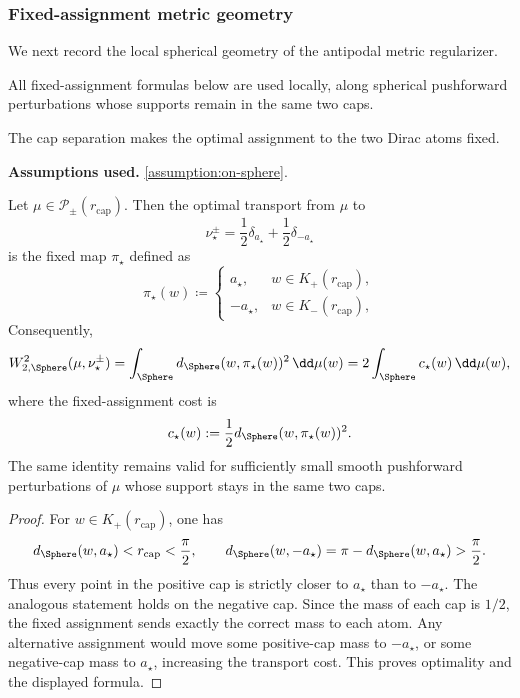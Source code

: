 \subsubsection{Fixed-assignment metric geometry}

We next record the local spherical geometry of the antipodal metric
regularizer.

All fixed-assignment formulas below are used locally, along spherical pushforward perturbations whose supports remain in the same two caps.

The cap separation makes the optimal assignment to the two Dirac atoms fixed.
\begin{lemma}
\label{lemma-fixed-assignment}
\textbf{Assumptions used.} \cref{assumption:on-sphere}.

Let \(\mu\in\mathcal P_\pm(r_{\mathrm{cap}})\).  Then the optimal transport from \(\mu\) to
\[
    \nu_\star^\pm=\frac12\delta_{a_\star}+\frac12\delta_{-a_\star}
\]
is the fixed map \(\pi_\star\)                                                               
defined as
\begin{equation}
\label{eq:mf-assigned-pole}
    \pi_\star(w)
    \coloneq
    \begin{cases}
        a_\star, & w\in K_+(r_{\mathrm{cap}}),\\
        -a_\star, & w\in K_-(r_{\mathrm{cap}}),
    \end{cases}
\end{equation}
Consequently,
\begin{equation}
\label{eq:fixed-assignment-W2-square-formula}
    W_{2,\Sphere}^2(\mu,\nu_\star^\pm)
    =
    \int_{\Sphere} d_\Sphere(w,\pi_\star(w))^2\,\dd\mu(w)
    =
    2\int_{\Sphere}c_\star(w)\,\dd\mu(w),
\end{equation}
where the fixed-assignment cost is
\begin{equation}
\label{eq:mf-fixed-assignment-cost}
c_\star(w):=\frac12 d_\Sphere(w,\pi_\star(w))^2.
\end{equation}
The same identity remains valid for sufficiently small smooth pushforward perturbations of \(\mu\) whose support stays in the same two caps.
\end{lemma}

\begin{proof}
For \(w\in K_+(r_{\mathrm{cap}})\), one has
\[
    d_\Sphere(w,a_\star)<r_{\mathrm{cap}}<\frac\pi2,
    \qquad
    d_\Sphere(w,-a_\star)=\pi-d_\Sphere(w,a_\star)>\frac\pi2.
\]
Thus every point in the positive cap is strictly closer to \(a_\star\) than to \(-a_\star\).  The analogous statement holds on the negative cap.  Since the mass of each cap is \(1/2\), the fixed assignment sends exactly the correct mass to each atom.  Any alternative assignment would move some positive-cap mass to \(-a_\star\), or some negative-cap mass to \(a_\star\), increasing the transport cost.  This proves optimality and the displayed formula.
\end{proof}

